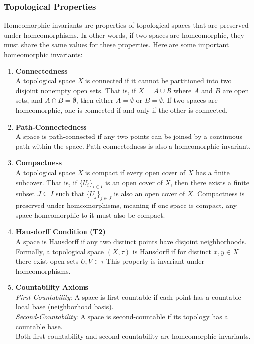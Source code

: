 \documentclass[a4paper]{article}
\begin{document}
\subsubsection{Topological Properties}
Homeomorphic invariants are properties of topological spaces that are preserved under homeomorphisms. In other words, if two spaces are homeomorphic, they must share the same values for these properties. Here are some important homeomorphic invariants:

\begin{enumerate}
    \item \textbf{Connectedness} \\
    A topological space $X$ is connected if it cannot be partitioned into two disjoint nonempty open sets. That is, if $X = A \cup B$ where $A$ and $B$ are open sets, and $A \cap B = \emptyset$, then either $A = \emptyset$ or $B = \emptyset$. If two spaces are homeomorphic, one is connected if and only if the other is connected.
    
    \item \textbf{Path-Connectedness} \\
    A space is path-connected if any two points can be joined by a continuous path within the space. Path-connectedness is also a homeomorphic invariant.
    
    \item \textbf{Compactness} \\
    A topological space $X$ is compact if every open cover of $X$ has a finite subcover. That is, if $\{U_i\}_{i \in I}$ is an open cover of $X$, then there exists a finite subset $J \subseteq I$ such that $\{U_j\}_{j \in J}$ is also an open cover of $X$. Compactness is preserved under homeomorphisms, meaning if one space is compact, any space homeomorphic to it must also be compact.
    
    \item \textbf{Hausdorff Condition (T2)} \\
    A space is Hausdorff if any two distinct points have disjoint neighborhoods.
    Formally, a topological space $(X, \tau)$ is Hausdorff if for distinct $x,y \in X$ there exist open sets $U,V \in \tau$ 
    This property is invariant under homeomorphisms.
    
    \item \textbf{Countability Axioms} \\
    \textit{First-Countability}: A space is first-countable if each point has a countable local base (neighborhood basis). \\
    \textit{Second-Countability}: A space is second-countable if its topology has a countable base. \\
    Both first-countability and second-countability are homeomorphic invariants.
    

\end{enumerate}
\end{document}

